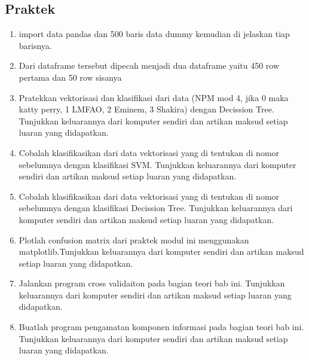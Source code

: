 \subsection{Praktek}
\begin{enumerate}
	\item import data pandas dan 500 baris data dummy kemudian di jelaskan tiap barisnya.
	\hfill\break
	

	\item Dari dataframe tersebut dipecah menjadi dua dataframe yaitu 450 row pertama dan 50 row sisanya
	\hfill\break
	

	\item Pratekkan vektorisasi dan klasiﬁkasi dari data (NPM mod 4, jika 0 maka katty perry, 1 LMFAO, 2 Eminem, 3 Shakira) dengan Decission Tree. Tunjukkan keluarannya dari komputer sendiri dan artikan maksud setiap luaran yang didapatkan.
	\hfill\break
	

	\item Cobalah klasiﬁkasikan dari data vektorisasi yang di tentukan di nomor sebelumnya dengan klasiﬁkasi SVM. Tunjukkan keluarannya dari komputer sendiri dan artikan maksud setiap luaran yang didapatkan.
	\hfill\break
	
	
	\item Cobalah klasiﬁkasikan dari data vektorisasi yang di tentukan di nomor sebelumnya dengan klasiﬁkasi Decission Tree. Tunjukkan keluarannya dari komputer sendiri dan artikan maksud setiap luaran yang didapatkan.
    \hfill\break
	
	
	\item Plotlah confusion matrix dari praktek modul ini menggunakan matplotlib.Tunjukkan keluarannya dari komputer sendiri dan artikan maksud setiap luaran yang didapatkan.
    \hfill\break
	
	
	\item Jalankan program cross validaiton pada bagian teori bab ini. Tunjukkan keluarannya dari komputer sendiri dan artikan maksud setiap luaran yang didapatkan.
	\hfill\break
	
	
	\item Buatlah program pengamatan komponen informasi pada bagian teori bab ini. Tunjukkan keluarannya dari komputer sendiri dan artikan maksud setiap luaran yang didapatkan.
	\hfill\break
	
\end{enumerate}

